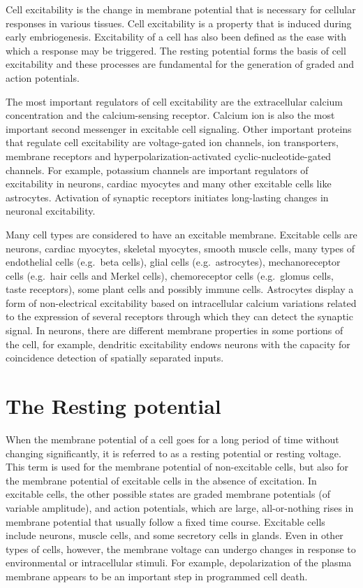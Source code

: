 \documentclass[]{book}
\begin{document}
Cell excitability is the change in membrane potential that is necessary for cellular responses in various tissues. Cell excitability is a property that is induced during early embriogenesis. Excitability of a cell has also been defined as the ease with which a response may be triggered. The resting potential forms the basis of cell excitability and these processes are fundamental for the generation of graded and action potentials.

The most important regulators of cell excitability are the extracellular calcium concentration and the calcium-sensing receptor. Calcium ion is also the most important second messenger in excitable cell signaling. Other important proteins that regulate cell excitability are voltage-gated ion channels, ion transporters, membrane receptors and hyperpolarization-activated cyclic-nucleotide-gated channels. For example, potassium channels are important regulators of excitability in neurons, cardiac myocytes and many other excitable cells like astrocytes. Activation of synaptic receptors initiates long-lasting changes in neuronal excitability.

Many cell types are considered to have an excitable membrane. Excitable cells are neurons, cardiac myocytes, skeletal myocytes, smooth muscle cells, many types of endothelial cells (e.g.~beta cells), glial cells (e.g.~astrocytes), mechanoreceptor cells (e.g.~hair cells and Merkel cells), chemoreceptor cells (e.g.~glomus cells, taste receptors), some plant cells and possibly immune cells. Astrocytes display a form of non-electrical excitability based on intracellular calcium variations related to the expression of several receptors through which they can detect the synaptic signal. In neurons, there are different membrane properties in some portions of the cell, for example, dendritic excitability endows neurons with the capacity for coincidence detection of spatially separated inputs.

\hypertarget{the-resting-potential}{%
\section{The Resting potential}\label{the-resting-potential}}

When the membrane potential of a cell goes for a long period of time without changing significantly, it is referred to as a resting potential or resting voltage. This term is used for the membrane potential of non-excitable cells, but also for the membrane potential of excitable cells in the absence of excitation. In excitable cells, the other possible states are graded membrane potentials (of variable amplitude), and action potentials, which are large, all-or-nothing rises in membrane potential that usually follow a fixed time course. Excitable cells include neurons, muscle cells, and some secretory cells in glands. Even in other types of cells, however, the membrane voltage can undergo changes in response to environmental or intracellular stimuli. For example, depolarization of the plasma membrane appears to be an important step in programmed cell death.
\end{document}
